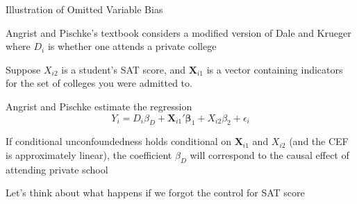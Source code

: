 \documentclass[11pt,english,handout]{beamer}
\newenvironment{wideitemize}{\itemize\addtolength{\itemsep}{10pt}}{\enditemize}
\begin{document}
\begin{frame}{Illustration of Omitted Variable Bias}
\begin{wideitemize}
	\item
	Angrist and Pischke's textbook considers a modified version of Dale and Krueger where $D_i$ is whether one attends a private college 
	
	\pause
	\item
	Suppose $X_{i2}$ is a student's SAT score, and $\bm{X}_{i1}$ is a vector containing indicators for the set of colleges you were admitted to. 
	
	\pause
	\item
	Angrist and Pischke estimate the regression
	$$Y_{i} = D_i \beta_D + \bm{X}_{i1}' \bm\beta_1 + X_{i2} \beta_2 + \epsilon_i $$
	
	\pause
	\item
	If conditional unconfoundedness holds conditional on $\bm{X}_{i1}$ and $X_{i2}$ (and the CEF is approximately linear), the coefficient $\beta_D$ will correspond to the causal effect of attending private school
	
	\pause
	\item
	Let's think about what happens if we forgot the control for SAT score
\end{wideitemize}
\end{frame}
\end{document}
